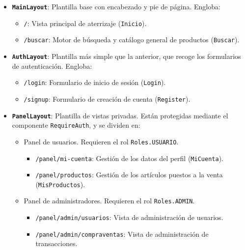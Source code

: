\documentclass[11pt]{article}
\begin{document}
      \begin{itemize}
          \item \textbf{\texttt{MainLayout}}: Plantilla base con encabezado y pie de página. Engloba:
                \begin{itemize}
                    \item \texttt{/}: Vista principal de aterrizaje (\texttt{Inicio}).
                    \item \texttt{/buscar}: Motor de búsqueda y catálogo general de productos (\texttt{Buscar}).
                \end{itemize}
          \item \textbf{\texttt{AuthLayout}}: Plantilla más simple que la anterior, que recoge los formularios de autenticación. Engloba:
                \begin{itemize}
                    \item \texttt{/login}: Formulario de inicio de sesión (\texttt{Login}).
                    \item \texttt{/signup}: Formulario de creación de cuenta (\texttt{Register}).
                \end{itemize}
          \item \textbf{\texttt{PanelLayout}}: Plantilla de vistas privadas. Están protegidas mediante el componente \texttt{RequireAuth}, y se dividen en:
                \begin{itemize}
                    \item Panel de usuarios. Requieren el rol \texttt{Roles.USUARIO}.
                          \begin{itemize}
                              \item \texttt{/panel/mi-cuenta}: Gestión de los datos del perfil (\texttt{MiCuenta}).
                              \item \texttt{/panel/productos}: Gestión de los artículos puestos a la venta (\texttt{MisProductos}).
                          \end{itemize}
                    \item Panel de administradores. Requieren el rol \texttt{Roles.ADMIN}.
                          \begin{itemize}
                              \item \texttt{/panel/admin/usuarios}: Vista de administración de usuarios.
                              \item \texttt{/panel/admin/compraventas}: Vista de administración de transacciones.

\end{itemize}
\end{itemize}
\end{itemize}
\end{document}
